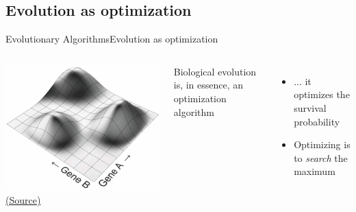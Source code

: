 \documentclass[10pt,compress]{beamer} %
\begin{document}
\subsection{Evolution as optimization}
\begin{frame}{Evolutionary Algorithms}{Evolution as optimization}
    \begin{columns}
	\begin{center}
	\includegraphics[width=\linewidth]{figs/fitness-landscape-0.png}\\
		\tiny \href{http://2.bp.blogspot.com/-32R9V6X6rXU/T-tr1lZIwCI/AAAAAAAAAFI/t05ioQ5GP80/s1600/Fitness-Landscape.gif}{(Source)}
	\end{center}
	Biological evolution is, in essence, an optimization algorithm
	\begin{itemize}
	\item ... it optimizes the survival probability
	\item Optimizing is to \textit{search} the maximum
	\end{itemize}
	\end{columns}
\end{frame}
\end{document}
